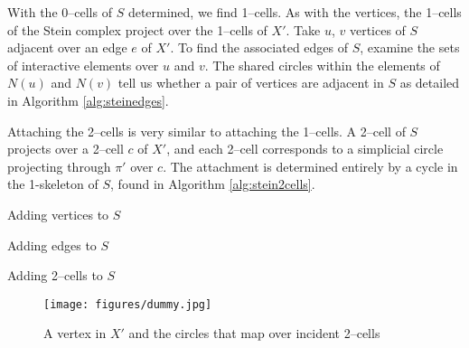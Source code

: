 With the 0--cells of $S$ determined, we find 1--cells.
As with the vertices, the 1--cells of the Stein complex project over the 1--cells of $X'$.
Take $u$, $v$ vertices of $S$ adjacent over an edge $e$ of $X'$.
To find the associated edges of $S$, examine the sets of interactive elements over $u$ and $v$.
The shared circles within the elements of $N(u)$ and $N(v)$ tell us whether a pair of vertices are adjacent in $S$ as detailed in Algorithm \ref{alg:steinedges}.

Attaching the 2--cells is very similar to attaching the 1--cells.
A 2--cell of $S$ projects over a 2--cell $c$ of $X'$, and each 2--cell corresponds to a simplicial circle projecting through $\pi'$ over $c$.
The attachment is determined entirely by a cycle in the 1-skeleton of $S$, found in Algorithm \ref{alg:stein2cells}.

\begin{algorithm}[h]
	\caption{Adding vertices to $S$}
	\label{alg:steinvertices}
\end{algorithm}

\begin{algorithm}[h]
	\caption{Adding edges to $S$}
	\label{alg:steinedges}
\end{algorithm}

\begin{algorithm}[h]
	\caption{Adding 2--cells to $S$}
	\label{alg:stein2cells}
\end{algorithm}

\begin{figure}
	\centering
	\captionsetup{justification=centering}
	\caption{A vertex in $X'$ and the circles that map over incident 2--cells}
	\texttt{[image: figures/dummy.jpg]}
	\label{fig:vertexprime}
\end{figure}